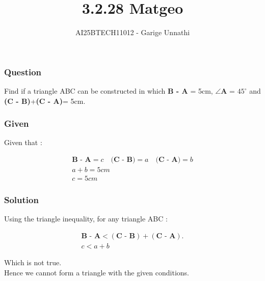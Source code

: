 \documentclass{beamer}
\title{3.2.28 Matgeo}
\author{AI25BTECH11012 - Garige Unnathi}
\date{}
\begin{document}
\frame{\titlepage}

\begin{frame}
\frametitle{Question}
Find if a triangle ABC can be constructed in which \textbf{B - A} = 5cm, $\angle \textbf{A}$ = $45^\circ$ and \textbf{(C - B)}+\textbf{(C - A)}= 5cm.
\end{frame}


\begin{frame}
\frametitle{Given}
Given that : 

\begin{align*}
 \textbf{B - A} = c \quad  \textbf{(C - B)} = a \quad \textbf{(C - A)} = b\\
  a + b = 5 cm\\
  c = 5cm
\end{align*}


\end{frame}
\begin{frame}
\frametitle{Solution}
Using the triangle inequality, for any triangle ABC :



\begin{align}
    \textbf{B - A}<(\textbf{C - B})+(\textbf{C - A}).\\
    c < a+b
 \end{align}


Which is not true.\\

Hence we cannot form a triangle with the given conditions.
\end{frame}
\end{document}
